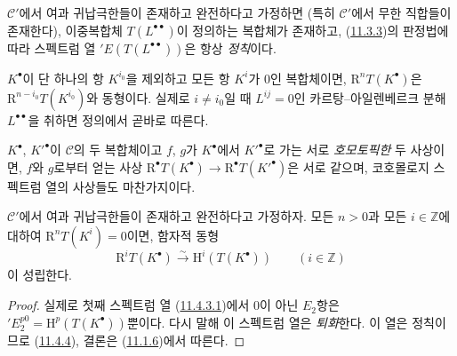 \begin{env}[11.4.3]
$\mathcal C'$에서 여과 귀납극한들이 존재하고 완전하다고 가정하면
(특히 $\mathcal C'$에서 무한 직합들이 존재한다), 이중복합체
$T(L^{\bullet\bullet})$이 정의하는 복합체가 존재하고,
(\hyperref[0.11.3.3-fr]{11.3.3})의 판정법에 따라 스펙트럼 열
$'E(T(L^{\bullet\bullet}))$은 항상 \emph{정칙}이다.

$K^\bullet$이 단 하나의 항 $K^{i_0}$을 제외하고 모든 항 $K^i$가
0인 복합체이면, $\mathrm R^nT(K^\bullet)$은
$\mathrm R^{n-i_0}T(K^{i_0})$와 동형이다. 실제로 $i\neq i_0$일 때
$L^{ij}=0$인 카르탕--아일렌베르크 분해 $L^{\bullet\bullet}$을 취하면
정의에서 곧바로 따른다.

$K^\bullet$, $K'^\bullet$이 $\mathcal C$의 두 복합체이고 $f$, $g$가
$K^\bullet$에서 $K'^\bullet$로 가는 서로 \emph{호모토픽한} 두
사상이면, $f$와 $g$로부터 얻는 사상
$\mathrm R^\bullet T(K^\bullet)\to
\mathrm R^\bullet T(K'^\bullet)$은 서로 같으며, 코호몰로지 스펙트럼
열의 사상들도 마찬가지이다.
\end{env}

\begin{proposition}[11.4.5]
\label{0.11.4.5-fr}
$\mathcal C'$에서 여과 귀납극한들이 존재하고 완전하다고 가정하자.
모든 $n>0$과 모든 $i\in\mathbb Z$에 대하여
$\mathrm R^nT(K^i)=0$이면, 함자적 동형
\[
  \label{0.11.4.5.1-fr}
  \mathrm R^iT(K^\bullet)\xrightarrow{\sim}
  \mathrm H^i(T(K^\bullet))\qquad(i\in\mathbb Z)
  \tag{11.4.5.1}
\]
이 성립한다.
\end{proposition}

\begin{proof}
실제로 첫째 스펙트럼 열 (\hyperref[0.11.4.3.1-fr]{11.4.3.1})에서
0이 아닌 $E_2$항은 $'E_2^{p0}=\mathrm H^p(T(K^\bullet))$뿐이다.
다시 말해 이 스펙트럼 열은 \emph{퇴화}한다. 이 열은 정칙이므로
(\hyperref[0.11.4.4-fr]{11.4.4}), 결론은
(\hyperref[0.11.1.6-fr]{11.1.6})에서 따른다.
\end{proof}

